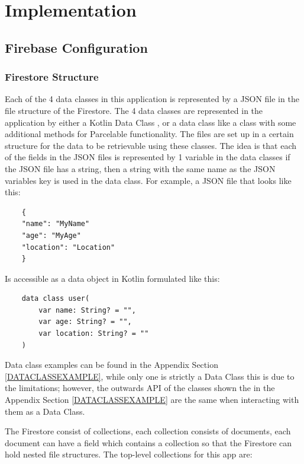 \chapter{Implementation} \label{IMPLEMENTATION}

\section{Firebase Configuration} \label{FIREBASECONFIGURATION}
    \subsection{Firestore Structure} \label{DATAIMPLEMENTATION}
    Each of the 4 data classes in this application is represented by a JSON file in the file structure of the Firestore. The 4 data classes are represented in the application by either a Kotlin Data Class \cite{KOTLINDATACLASS}, or a data class like a class with some additional methods for Parcelable functionality. The files are set up in a certain structure for the data to be retrievable using these classes. The idea is that each of the fields in the JSON files is represented by 1 variable in the data classes if the JSON file has a string, then a string with the same name as the JSON variables key is used in the data class. For example, a JSON file that looks like this:
    
\begin{verbatim}
    {
    "name": "MyName"
    "age": "MyAge"
    "location": "Location"
    }
\end{verbatim}
    
    Is accessible as a data object in Kotlin formulated like this:
    
\begin{verbatim}
    data class user(
        var name: String? = "",
        var age: String? = "",
        var location: String? = ""
    )
\end{verbatim}

    Data class examples can be found in the Appendix Section \ref{DATACLASSEXAMPLE}, while only one is strictly a Data Class this is due to the limitations; however, the outwards API of the classes shown the in the Appendix Section \ref{DATACLASSEXAMPLE} are the same when interacting with them as a Data Class.
    
    The Firestore consist of collections, each collection consists of documents, each document can have a field which contains a collection so that the Firestore can hold nested file structures. The top-level collections for this app are:
    
